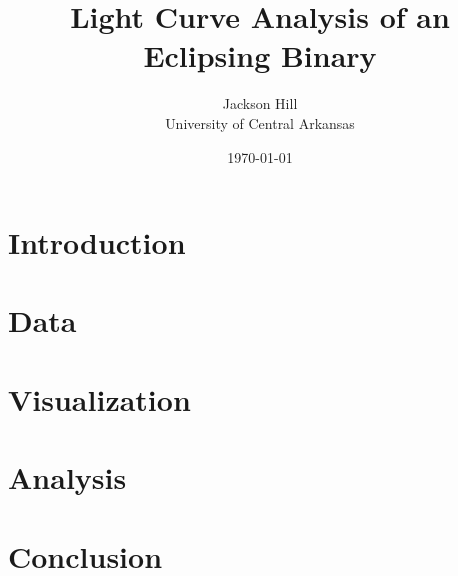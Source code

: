 \documentclass[12pt]{article}
\title{Light Curve Analysis of an Eclipsing Binary}
\author{Jackson Hill \\ University of Central Arkansas}
\date{\today}
\begin{document}
\maketitle
\clearpage


\clearpage

\section{Introduction}

\clearpage

\section{Data}

\clearpage

\section{Visualization}

\clearpage

\section{Analysis}

\clearpage

\section{Conclusion}

\clearpage



\end{document}
